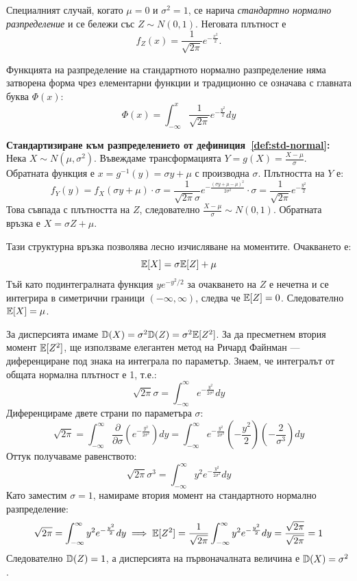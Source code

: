 \begin{defn}\label{def:std-normal}
Специалният случай, когато $\mu = 0$ и $\sigma^2 = 1$, се нарича \emph{стандартно нормално разпределение} и се бележи със $Z \sim N(0, 1)$. Неговата плътност е
\[
f_Z(x) = \frac{1}{\sqrt{2\pi}} e^{-\frac{x^2}{2}} .
\]
\end{defn}
Функцията на разпределение на стандартното нормално разпределение няма затворена форма чрез елементарни функции и традиционно се означава с главната буква $\Phi(x)$:
\[
\Phi(x) = \int_{-\infty}^{x} \frac{1}{\sqrt{2\pi}} e^{-\frac{y^2}{2}} dy
\]

\textbf{Стандартизиране към разпределението от дефиниция~\ref{def:std-normal}:}
Нека $X \sim N(\mu, \sigma^2)$. Въвеждаме трансформацията $Y = g(X) = \frac{X-\mu}{\sigma}$. Обратната функция е $x = g^{-1}(y) = \sigma y + \mu$ с производна $\sigma$.
Плътността на $Y$ е:
\[
f_Y(y) = f_X(\sigma y + \mu) \cdot \sigma = \frac{1}{\sqrt{2\pi}\sigma} e^{-\frac{(\sigma y + \mu - \mu)^2}{2\sigma^2}} \cdot \sigma = \frac{1}{\sqrt{2\pi}} e^{-\frac{y^2}{2}}
\]
Това съвпада с плътността на $Z$, следователно $\frac{X-\mu}{\sigma} \sim N(0, 1)$. Обратната връзка е $X = \sigma Z + \mu$.

Тази структурна връзка позволява лесно изчисляване на моментите. Очакването е:
\[
\mathbb{E}[X] = \sigma\mathbb{E}[Z] + \mu
\]
Тъй като подинтегралната функция $y e^{-y^2/2}$ за очакването на $Z$ е нечетна и се интегрира в симетрични граници $(-\infty, \infty)$, следва че $\mathbb{E}[Z] = 0$. Следователно $\mathbb{E}[X] = \mu$.

За дисперсията имаме $\mathbb{D}(X) = \sigma^2 \mathbb{D}(Z) = \sigma^2 \mathbb{E}[Z^2]$. За да пресметнем втория момент $\mathbb{E}[Z^2]$, ще използваме елегантен метод на Ричард Файнман — диференциране под знака на интеграла по параметър.
Знаем, че интегралът от общата нормална плътност е 1, т.е.:
\[
\sqrt{2\pi}\sigma = \int_{-\infty}^{\infty} e^{-\frac{y^2}{2\sigma^2}} dy
\]
Диференцираме двете страни по параметъра $\sigma$:
\[
\sqrt{2\pi} = \int_{-\infty}^{\infty} \frac{\partial}{\partial \sigma} \left( e^{-\frac{y^2}{2\sigma^2}} \right) dy = \int_{-\infty}^{\infty} e^{-\frac{y^2}{2\sigma^2}} \left(-\frac{y^2}{2}\right) \left(-\frac{2}{\sigma^3}\right) dy
\]
Оттук получаваме равенството:
\[
\sqrt{2\pi}\sigma^3 = \int_{-\infty}^{\infty} y^2 e^{-\frac{y^2}{2\sigma^2}} dy
\]
Като заместим $\sigma = 1$, намираме втория момент на стандартното нормално разпределение:
\[
\sqrt{2\pi} = \int_{-\infty}^{\infty} y^2 e^{-\frac{y^2}{2}} dy \implies \mathbb{E}[Z^2] = \frac{1}{\sqrt{2\pi}} \int_{-\infty}^{\infty} y^2 e^{-\frac{y^2}{2}} dy = \frac{\sqrt{2\pi}}{\sqrt{2\pi}} = 1
\]
Следователно $\mathbb{D}(Z) = 1$, а дисперсията на първоначалната величина е $\mathbb{D}(X) = \sigma^2$.


